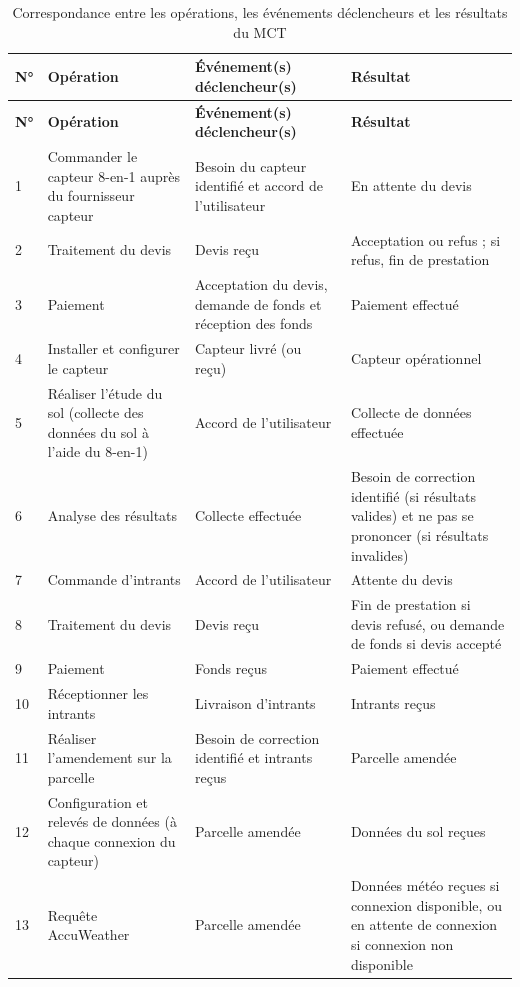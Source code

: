 {\small
\begin{longtable}{|p{0.8cm}|p{4.2cm}|p{4.2cm}|p{4.8cm}|}
    \caption{Correspondance entre les opérations, les événements déclencheurs et les résultats du MCT}
    \label{tab:operations_mct} \\
    \hline
    \textbf{N°} & \textbf{Opération} & \textbf{Événement(s) déclencheur(s)} & \textbf{Résultat} \\
    \hline
    \endfirsthead
    \hline
    \textbf{N°} & \textbf{Opération} & \textbf{Événement(s) déclencheur(s)} & \textbf{Résultat} \\
    \hline
    \endhead
    1 & Commander le capteur 8-en-1 auprès du fournisseur capteur & Besoin du capteur identifié et accord de l'utilisateur & En attente du devis \\
    \hline
    2 & Traitement du devis & Devis reçu & Acceptation ou refus ; si refus, fin de prestation \\
    \hline
    3 & Paiement & Acceptation du devis, demande de fonds et réception des fonds & Paiement effectué \\
    \hline
    4 & Installer et configurer le capteur & Capteur livré (ou reçu) & Capteur opérationnel \\
    \hline
    5 & Réaliser l'étude du sol (collecte des données du sol à l'aide du 8-en-1) & Accord de l'utilisateur & Collecte de données effectuée \\
    \hline
    6 & Analyse des résultats & Collecte effectuée & Besoin de correction identifié (si résultats valides) et ne pas se prononcer (si résultats invalides) \\
    \hline
    7 & Commande d'intrants & Accord de l'utilisateur & Attente du devis \\
    \hline
    8 & Traitement du devis & Devis reçu & Fin de prestation si devis refusé, ou demande de fonds si devis accepté \\
    \hline
    9 & Paiement & Fonds reçus & Paiement effectué \\
    \hline
    10 & Réceptionner les intrants & Livraison d'intrants & Intrants reçus \\
    \hline
    11 & Réaliser l'amendement sur la parcelle & Besoin de correction identifié et intrants reçus & Parcelle amendée \\
    \hline
    12 & Configuration et relevés de données (à chaque connexion du capteur) & Parcelle amendée & Données du sol reçues \\
    \hline
    13 & Requête AccuWeather & Parcelle amendée & Données météo reçues si connexion disponible, ou en attente de connexion si connexion non disponible \\

\end{longtable}}
